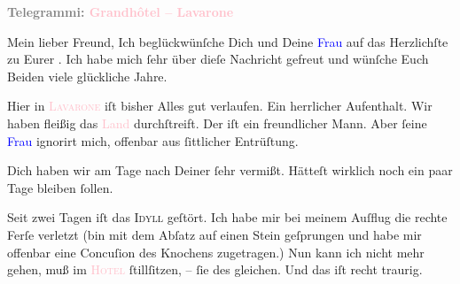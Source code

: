 \pstart
           \textcolor{gray}{\textbf{Telegrammi: \textcolor{pink}{Grandhôtel – Lavarone}{}\ledrightnote{\textcolor{pink}{Grand Hotel Lavarone}}}}\pend
           
\pstart\center{}Mein lieber Freund,\pend
\pstart
           Ich beglückwünſche Dich und Deine \textcolor{blue}{Frau}{}\ledrightnote{{$\rightarrow$}\textcolor{blue}{Olga Schnitzler}} auf das Herzlichſte zu Eurer \label{K_L03385-2v}\label{K_L03385-2h}. Ich habe mich ſehr über dieſe Nachricht gefreut und wünſche
               Euch Beiden viele glückliche Jahre.\pend
           
\pstart
           Hier in \textsc{\textcolor{pink}{Lavarone}{}\ledrightnote{\textcolor{pink}{Lavarone}}} iſt bisher Alles gut  verlaufen. Ein
               herrlicher Aufenthalt. Wir haben fleißig das \textcolor{pink}{Land}{}\ledrightnote{{$\rightarrow$}\textcolor{pink}{Südtirol}} durchſtreift. Der \label{K_L03385-3v}\label{K_L03385-3h} iſt ein
               freundlicher Mann. Aber ſeine \textcolor{blue}{Frau}{}\ledrightnote{{$\rightarrow$}\textcolor{blue}{?? [Frau eines Frankfurter Oberstaatsanwalts]}} ignorirt mich, offenbar aus ſittlicher Entrüſtung.\pend
           
\pstart
           Dich haben wir am Tage nach Deiner \label{K_L03385-5v}\label{K_L03385-5h} ſehr vermißt.
               Hätteſt wirklich noch ein paar Tage bleiben ſollen.\pend
           
\pstart
           Seit zwei Tagen iſt das \textsc{Idyll} geſtört. Ich habe mir bei
               meinem Auſflug die \introOben{}rechte\introOben{} Ferſe verletzt (bin mit dem Abſatz
               auf einen Stein geſprungen und habe mir offenbar eine Concuſion des Knochens
               zugetragen.) Nun kann ich nicht mehr {\pb}gehen, muß im
                  \textsc{\textcolor{pink}{Hotel}{}\ledrightnote{{$\rightarrow$}\textcolor{pink}{Grand Hotel Lavarone}}}{ } ſtillſitzen, – ſie des gleichen. Und das iſt recht traurig.\pend
           
